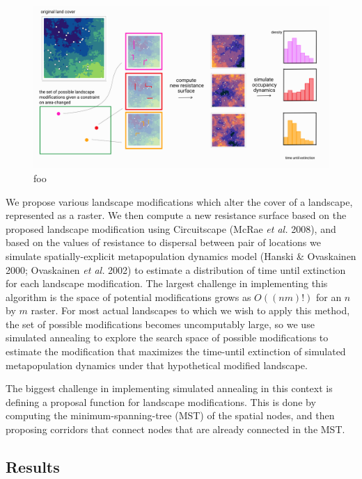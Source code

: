 \documentclass[10pt,oneside]{article}
\makeatletter
\def\maxwidth{\ifdim\Gin@nat@width>\linewidth\linewidth
\else\Gin@nat@width\fi}
\let\Oldincludegraphics\includegraphics
\renewcommand{\includegraphics}[1]{\Oldincludegraphics[width=\maxwidth]{#1}}
\makeatother
\begin{document}
\begin{figure}
\hypertarget{fig:ch3}{%
\centering
\includegraphics{./figures/ch3.png}
\caption{foo}\label{fig:ch3}
}
\end{figure}

We propose various landscape modifications which alter the cover of a
landscape, represented as a raster. We then compute a new resistance
surface based on the proposed landscape modification using Circuitscape
(McRae \emph{et al.} 2008), and based on the values of resistance to
dispersal between pair of locations we simulate spatially-explicit
metapopulation dynamics model (Hanski \& Ovaskainen 2000; Ovaskainen
\emph{et al.} 2002) to estimate a distribution of time until extinction
for each landscape modification. The largest challenge in implementing
this algorithm is the space of potential modifications grows as
\(O((nm)!)\) for an \(n\) by \(m\) raster. For most actual landscapes to
which we wish to apply this method, the set of possible modifications
becomes uncomputably large, so we use simulated annealing to explore the
search space of possible modifications to estimate the modification that
maximizes the time-until extinction of simulated metapopulation dynamics
under that hypothetical modified landscape.

The biggest challenge in implementing simulated annealing in this
context is defining a proposal function for landscape modifications.
This is done by computing the minimum-spanning-tree (MST) of the spatial
nodes, and then proposing corridors that connect nodes that are already
connected in the MST.

\hypertarget{results-2}{%
\subsection{Results}\label{results-2}}
\end{document}
